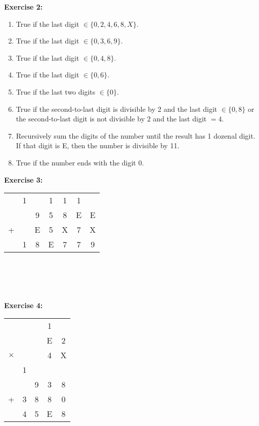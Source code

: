 \documentclass{article}
\begin{document}
\begin{enumerate}
	      {\bf Exercise 2: } \\
	      \begin{enumerate}
		      \item True if the last digit $\in \{0, 2,4,6,8,X\}$.
		      \item True if the last digit $\in \{0, 3,6,9\}$.
		      \item True if the last digit $\in \{0, 4,8\}$.
		      \item True if the last digit $\in \{0, 6\}$.
		      \item True if the last two digits $\in \{0\}$.
		      \item True if the second-to-last digit is divisible by 2 and the last digit $\in \{0, 8\}$ or
		            the second-to-last digit is not divisible by 2 and the last digit $ = 4$.

		      \item Recursively sum the digits of the number until the result has 1 dozenal digit. If that
		            digit is E, then the number is divisible by 11.

		      \item True if the number ends with the digit 0.
	      \end{enumerate}

	      {\bf Exercise 3: } \\

	      \begin{tabular}{ccccccc}
		        & 1 &   & 1 & 1 & 1 &   \\
		        &   & 9 & 5 & 8 & E & E \\
		      + &   & E & 5 & X & 7 & X \\
		      \hline
		        & 1 & 8 & E & 7 & 7 & 9 \\
	      \end{tabular} \\
	       \\ \\ \\


	      {\bf Exercise 4: } \\

	      \begin{tabular}{ccccc}
		               &   &   & 1 &   \\
		               &   &   & E & 2 \\
		      $\times$ &   &   & 4 & X \\
		      \hline
		               & 1 &   &   &   \\
		               &   & 9 & 3 & 8 \\
		      +        & 3 & 8 & 8 & 0 \\
		      \hline
		               & 4 & 5 & E & 8 \\
	      \end{tabular}


\end{enumerate}
\end{document}
